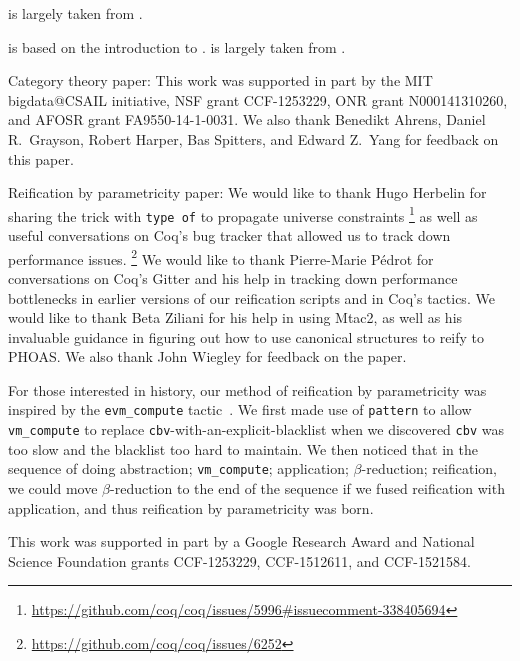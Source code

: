  is largely taken from .

 is based on the introduction to \textcite{reification-by-parametricity}.
 is largely taken from \textcite{reification-by-parametricity}.

Category theory paper: This work was supported in part by the MIT bigdata@CSAIL initiative, NSF grant CCF-1253229, ONR grant N000141310260, and AFOSR grant FA9550-14-1-0031.  We also thank Benedikt Ahrens, Daniel R.~Grayson, Robert Harper, Bas Spitters, and Edward Z.~Yang for feedback on this paper.

Reification by parametricity paper:
We would like to thank Hugo Herbelin for sharing the trick with \texttt{type of} to propagate universe constraints%
\footnote{%
    \url{https://github.com/coq/coq/issues/5996\#issuecomment-338405694}%
}
as well as useful conversations on Coq's bug tracker that allowed us to track down performance issues.%
\footnote{%
    \url{https://github.com/coq/coq/issues/6252}%
}
We would like to thank Pierre-Marie P\'edrot for conversations on Coq's Gitter and his help in tracking down performance bottlenecks in earlier versions of our reification scripts and in Coq's tactics.
We would like to thank Beta Ziliani for his help in using Mtac2, as well as his invaluable guidance in figuring out how to use canonical structures to reify to PHOAS.
We also thank John Wiegley for feedback on the paper.

For those interested in history, our method of reification by parametricity was inspired by the \texttt{evm\_compute} tactic~\cite{MirrorShardITP14}.
We first made use of \texttt{pattern} to allow \texttt{vm\_compute} to replace \texttt{cbv}-with-an-explicit-blacklist when we discovered \texttt{cbv} was too slow and the blacklist too hard to maintain.
We then noticed that in the sequence of doing abstraction; \texttt{vm\_compute}; application; $\beta$-reduction; reification, we could move $\beta$-reduction to the end of the sequence if we fused reification with application, and thus reification by parametricity was born.

This work was supported in part by a Google Research Award and National Science Foundation grants CCF-1253229, CCF-1512611, and CCF-1521584.



